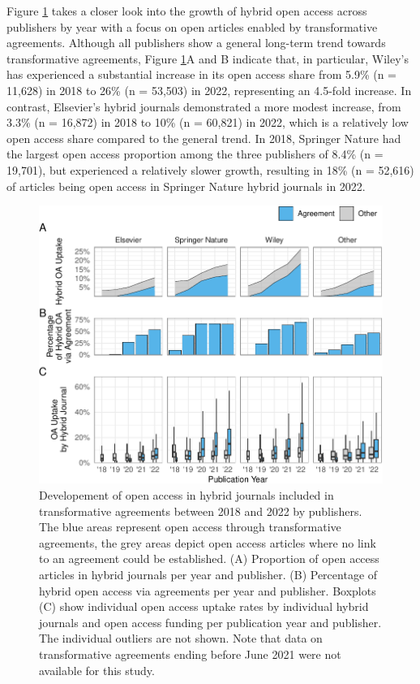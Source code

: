 \documentclass[a4paper,man,floatsintext,longtable,noextraspace,12pt]{apa6}
\begin{document}
Figure \ref{fig:publisher_figure} takes a closer look into the growth of
hybrid open access across publishers by year with a focus on open
articles enabled by transformative agreements. Although all publishers
show a general long-term trend towards transformative agreements, Figure
\ref{fig:publisher_figure}A and B indicate that, in particular, Wiley's
has experienced a substantial increase in its open access share from
5.9\% (n = 11,628) in 2018 to 26\% (n = 53,503) in 2022, representing an
4.5-fold increase. In contrast, Elsevier's hybrid journals demonstrated
a more modest increase, from 3.3\% (n = 16,872) in 2018 to 10\% (n =
60,821) in 2022, which is a relatively low open access share compared to
the general trend. In 2018, Springer Nature had the largest open access
proportion among the three publishers of 8.4\% (n = 19,701), but
experienced a relatively slower growth, resulting in 18\% (n = 52,616)
of articles being open access in Springer Nature hybrid journals in
2022.

\begin{figure}[ht!]

{\centering \includegraphics[width=0.99\linewidth,]{fig/publisher_figure-1} 

}

\caption{Developement of open access in hybrid journals included in transformative agreements between 2018 and 2022 by publishers. The blue areas represent open access through transformative agreements, the grey areas depict open access articles where no link to an agreement could be established. (A) Proportion of open access articles in hybrid journals per year and publisher. (B) Percentage of hybrid open access via agreements per year and publisher. Boxplots (C) show individual open access uptake rates by individual hybrid journals and open access funding per publication year and publisher. The individual outliers are not shown. Note that data on transformative agreements ending before June 2021 were not available for this study.}\label{fig:publisher_figure}
\end{figure}
\end{document}
